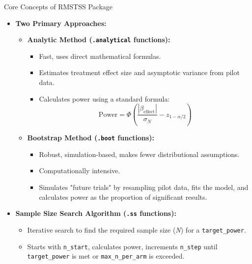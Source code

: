 \documentclass{beamer}
\begin{document}
\begin{frame}{Core Concepts of RMSTSS Package}
\begin{itemize}
    \item \textbf{Two Primary Approaches:}
    \begin{itemize}
        \item \textbf{Analytic Method (\texttt{.analytical} functions):}
        \begin{itemize}
            \item Fast, uses direct mathematical formulas.
            \item Estimates treatment effect size and asymptotic variance from pilot data.
            \item Calculates power using a standard formula:
            $$ \text{Power} = \Phi\left( \frac{|\beta_{\mathrm{effect}}|}{\sigma_N} - z_{1-\alpha/2} \right) $$
        \end{itemize}
        \item \textbf{Bootstrap Method (\texttt{.boot} functions):}
        \begin{itemize}
            \item Robust, simulation-based, makes fewer distributional assumptions.
            \item Computationally intensive.
            \item Simulates "future trials" by resampling pilot data, fits the model, and calculates power as the proportion of significant results.
        \end{itemize}
    \end{itemize}
    \item \textbf{Sample Size Search Algorithm (\texttt{.ss} functions):}
    \begin{itemize}
        \item Iterative search to find the required sample size (\textit{N}) for a \texttt{target\_power}.
        \item Starts with \texttt{n\_start}, calculates power, increments \texttt{n\_step} until \texttt{target\_power} is met or \texttt{max\_n\_per\_arm} is exceeded.
    \end{itemize}
\end{itemize}
\end{frame}
\end{document}
